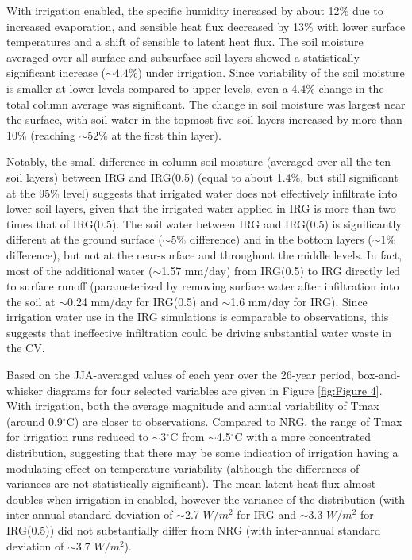 \documentclass[draft,ms]{agutex}   %
\begin{document}
\begin{article}
With irrigation enabled, the specific humidity increased by about 12$\%$ due to increased evaporation, and sensible heat flux decreased by 13\% with lower surface temperatures and a shift of sensible to latent heat flux. The soil moisture averaged over all surface and subsurface soil layers showed a statistically significant increase ($\sim4.4\%$) under irrigation. Since variability of the soil moisture is smaller at lower levels compared to upper levels, even a 4.4$\%$ change in the total column average was significant.  The change in soil moisture was largest near the surface, with soil water in the topmost five soil layers increased by more than 10$\%$ (reaching $\sim52\%$ at the first thin layer).


Notably, the small difference in column soil moisture (averaged over all the ten soil layers) between IRG and IRG(0.5) (equal to about 1.4$\%$, but still significant at the 95\% level) suggests that irrigated water does not effectively infiltrate into lower soil layers, given that the irrigated water applied in IRG is more than two times that of IRG(0.5). The soil water between IRG and IRG(0.5) is significantly different at the ground surface ($\sim5\%$ difference) and in the bottom layers ($\sim1\%$ difference), but not at the near-surface and throughout the middle levels. In fact, most of the additional water ($\sim$1.57 mm/day) from IRG(0.5) to IRG directly led to surface runoff (parameterized by removing surface water after infiltration into the soil at $\sim$0.24 mm/day for IRG(0.5) and $\sim$1.6 mm/day for IRG). Since irrigation water use in the IRG simulations is comparable to observations, this suggests that ineffective infiltration could be driving substantial water waste in the CV.


Based on the JJA-averaged values of each year over the 26-year period, box-and-whisker diagrams for four selected variables are given in Figure \ref{fig:Figure 4}. With irrigation, both the average magnitude and annual variability of Tmax (around 0.9$^\circ$C) are closer to observations. Compared to NRG, the range of Tmax for irrigation runs reduced to $\sim$3$^\circ$C from $\sim$4.5$^\circ$C with a more concentrated distribution, suggesting that there may be some indication of irrigation having a modulating effect on temperature variability (although the differences of variances are not statistically significant). The mean latent heat flux almost doubles when irrigation in enabled, however the variance of the distribution (with inter-annual {\color{red}standard deviation} of $\sim$2.7 $W/m^2$ for IRG and $\sim$3.3 $W/m^2$ for IRG(0.5)) did not substantially differ from NRG (with inter-annual {\color{red}standard deviation} of $\sim$3.7 $W/m^2$). 


\end{article}
\end{document}

